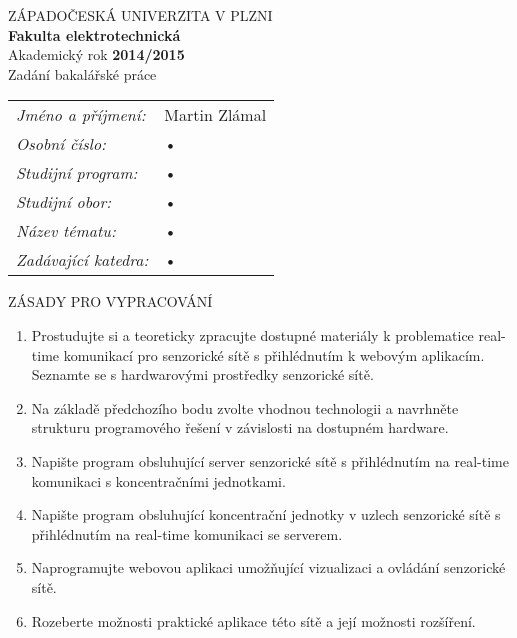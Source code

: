 \pagestyle{empty}
\begin{titlepage}
\begin{center}
{\Large ZÁPADOČESKÁ UNIVERZITA V PLZNI} \\
\textbf{Fakulta elektrotechnická} \\
Akademický rok \textbf{2014/2015} \\
\vspace{2cm}
{\Huge\sc Zadání bakalářské práce} \\
\end{center}
\vspace{2cm}
\begin{tabular}{ll}
\textit{Jméno a příjmení:} & Martin Zlámal \\ 
\textit{Osobní číslo:} & • \\ 
\textit{Studijní program:} & • \\ 
\textit{Studijní obor:} & • \\ 
\textit{Název tématu:} & • \\ 
\textit{Zadávající katedra:} & • \\ 
\end{tabular} 

\vspace{2cm}
\begin{center}
{\large ZÁSADY PRO VYPRACOVÁNÍ} \\
\end{center}
\begin{enumerate}
\item Prostudujte si a teoreticky zpracujte dostupné materiály k problematice real-time komunikací pro senzorické sítě s přihlédnutím k webovým aplikacím. Seznamte se s hardwarovými prostředky senzorické sítě.
\item Na základě předchozího bodu zvolte vhodnou technologii a navrhněte strukturu programového řešení v závislosti na dostupném hardware.
\item Napište program obsluhující server senzorické sítě s přihlédnutím na real-time komunikaci s koncentračními jednotkami.
\item Napište program obsluhující koncentrační jednotky v uzlech senzorické sítě s přihlédnutím na real-time komunikaci se serverem.
\item Naprogramujte webovou aplikaci umožňující vizualizaci a ovládání senzorické sítě.
\item Rozeberte možnosti praktické aplikace této sítě a její možnosti rozšíření.
\end{enumerate}
\end{titlepage}